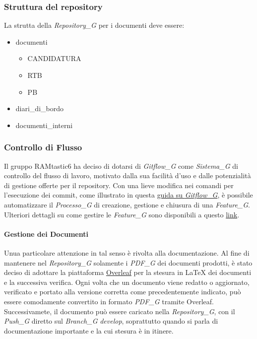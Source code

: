 \documentclass[12pt, oneside]{article}
\begin{document}
\subsubsection{Struttura del repository}
La strutta della \textit{Repository_G} per i documenti deve essere:
\begin{itemize}
    \item documenti
    \begin{itemize}
        \item CANDIDATURA
        \item RTB
        \item PB
    \end{itemize}
    \item diari\_di\_bordo
    \item documenti\_interni
\end{itemize}
\subsubsection{Controllo di Flusso}
Il gruppo RAMtastic6 ha deciso di dotarsi di \textit{Gitflow_G} come \textit{Sistema_G} di controllo del flusso di lavoro, motivato dalla sua facilità d'uso e dalle potenzialità di gestione offerte per il repository. Con una lieve modifica nei comandi per l'esecuzione dei commit, come illustrato in questa \href{https://www.atlassian.com/git/tutorials/comparing-workflows/gitflow-workflow}{guida su \textit{Gitflow_G}}, è possibile automatizzare il \textit{Processo_G} di creazione, gestione e chiusura di una \textit{Feature_G}. Ulteriori dettagli su come gestire le \textit{Feature_G} sono disponibili a questo \href{http://danielkummer.github.io/git-flow-cheatsheet/}{link}.
\paragraph{Gestione dei Documenti}
Unua particolare attenzione in tal senso è rivolta alla documentazione. Al fine di mantenere nel \textit{Repository_G} solamente i \textit{PDF_G} dei documenti prodotti, è stato deciso di adottare la piattaforma \href{https://www.overleaf.com/project}{Overleaf} per la stesura in LaTeX dei documenti e la successiva verifica. Ogni volta che un documento viene redatto o aggiornato, verificato e portato alla versione corretta come precedentemente indicato, può essere comodamente convertito in formato \textit{PDF_G} tramite Overleaf. Successivamete, il documento può essere caricato nella \textit{Repository_G}, con il \textit{Push_G} diretto sul \textit{Branch_G} \textit{develop}, soprattutto quando si parla di documentazione importante e la cui stesura è in itinere.
\end{document}

